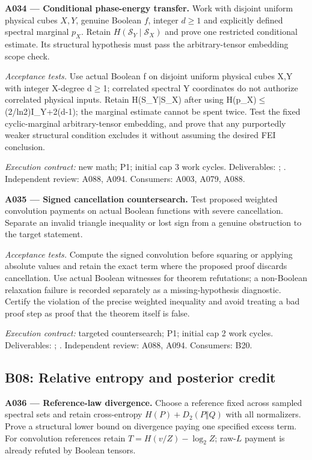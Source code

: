 \documentclass[11pt]{article}
\begin{document}
\textbf{A034 --- Conditional phase-energy transfer.} Work with disjoint uniform physical cubes $X,Y$, genuine Boolean $f$, integer $d\ge1$ and explicitly defined spectral marginal $p_X$. Retain $H(\mathcal S_Y\mid\mathcal S_X)$ and prove one restricted conditional estimate. Its structural hypothesis must pass the arbitrary-tensor embedding scope check.

\emph{Acceptance tests.} Use actual Boolean f on disjoint uniform physical cubes X,Y with integer X-degree d$\ge$1; correlated spectral Y coordinates do not authorize correlated physical inputs. Retain H(S\_Y|S\_X) after using H(p\_X)$\le$(2/ln2)I\_Y+2(d-1); the marginal estimate cannot be spent twice. Test the fixed cyclic-marginal arbitrary-tensor embedding, and prove that any purportedly weaker structural condition excludes it without assuming the desired FEI conclusion.

{\small\emph{Execution contract:} new math; P1; initial cap 3 work cycles. Deliverables: ; . Independent review: A088, A094. Consumers: A003, A079, A088.}

\textbf{A035 --- Signed cancellation countersearch.} Test proposed weighted convolution payments on actual Boolean functions with severe cancellation. Separate an invalid triangle inequality or lost sign from a genuine obstruction to the target statement.

\emph{Acceptance tests.} Compute the signed convolution before squaring or applying absolute values and retain the exact term where the proposed proof discards cancellation. Use actual Boolean witnesses for theorem refutations; a non-Boolean relaxation failure is recorded separately as a missing-hypothesis diagnostic. Certify the violation of the precise weighted inequality and avoid treating a bad proof step as proof that the theorem itself is false.

{\small\emph{Execution contract:} targeted countersearch; P1; initial cap 2 work cycles. Deliverables: ; . Independent review: A088, A094. Consumers: B20.}

\subsection{B08: Relative entropy and posterior credit}

\textbf{A036 --- Reference-law divergence.} Choose a reference fixed across sampled spectral sets and retain cross-entropy $H(P)+D_2(P\Vert Q)$ with all normalizers. Prove a structural lower bound on divergence paying one specified excess term. For convolution references retain $T=H(v/Z)-\log_2 Z$; raw-$L$ payment is already refuted by Boolean tensors.
\end{document}
